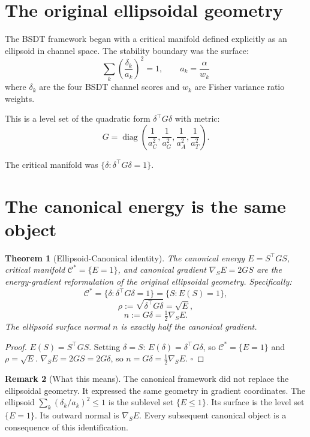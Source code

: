 \documentclass[11pt,a4paper,openany]{book}
\newtheorem{theorem}{Theorem}[chapter]
\theoremstyle{definition}
\newtheorem{remark}[theorem]{Remark}
\begin{document}
\section{The original ellipsoidal geometry}

The BSDT framework began with a critical manifold defined explicitly as an ellipsoid
in channel space. The stability boundary was the surface:
\[
\sum_k\left(\frac{\delta_k}{a_k}\right)^2 = 1,
\qquad a_k = \frac{\alpha}{w_k}
\]
where $\delta_k$ are the four BSDT channel scores and $w_k$ are Fisher variance
ratio weights.

This is a level set of the quadratic form $\delta^\top G\delta$ with metric:
\[
G = \operatorname{diag}\!\left(\frac{1}{a_C^2},\frac{1}{a_G^2},\frac{1}{a_A^2},\frac{1}{a_T^2}\right).
\]

The critical manifold was $\{\delta : \delta^\top G\delta = 1\}$.

\section{The canonical energy is the same object}

\begin{theorem}[Ellipsoid-Canonical identity]
\label{thm:origin}
The canonical energy $E = S^\top GS$, critical manifold $\mathcal{C}^* = \{E=1\}$,
and canonical gradient $\nabla_S E = 2GS$ are the energy-gradient reformulation
of the original ellipsoidal geometry. Specifically:
\[
\mathcal{C}^* = \{\delta : \delta^\top G\delta = 1\} = \{S : E(S) = 1\},
\]
\[
\rho := \sqrt{\delta^\top G\delta} = \sqrt{E},
\]
\[
n := G\delta = \tfrac{1}{2}\nabla_S E.
\]
The ellipsoid surface normal $n$ is exactly half the canonical gradient.
\end{theorem}

\begin{proof}
$E(S) = S^\top GS$. Setting $\delta = S$:
$E(\delta) = \delta^\top G\delta$,
so $\mathcal{C}^* = \{E=1\}$ and $\rho = \sqrt{E}$.
$\nabla_S E = 2GS = 2G\delta$,
so $n = G\delta = \frac{1}{2}\nabla_S E$.
$\square$
\end{proof}

\begin{remark}[What this means]
The canonical framework did not replace the ellipsoidal geometry.
It expressed the same geometry in gradient coordinates.
The ellipsoid $\sum_k(\delta_k/a_k)^2 \leq 1$ is the sublevel set $\{E \leq 1\}$.
Its surface is the level set $\{E = 1\}$.
Its outward normal is $\nabla_S E$.
Every subsequent canonical object is a consequence of this identification.
\end{remark}
\end{document}
